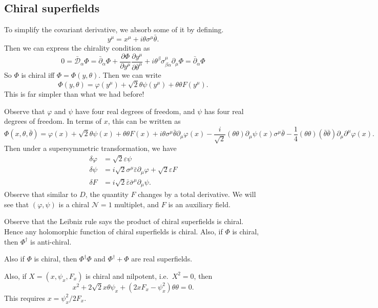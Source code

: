 \documentclass[a4paper]{article}
\begin{document}
\subsection{Chiral superfields}
To simplify the covariant derivative, we absorb some of it by defining.
\[
  y^\mu = x^\mu + i \theta \sigma^\mu \bar{\theta}.
\]
Then we can express the chirality condition as
\[
  0 = \bar{\mathcal{D}}_\alpha \Phi = \bar{\partial}_{\dot{\alpha}} \Phi + \frac{\partial \Phi}{\partial y^\mu} \frac{\partial y^\mu}{\partial \bar{\theta}^\mu} + i \theta^\beta \sigma^\mu_{\beta \dot{\alpha}} \partial_\mu \Phi = \bar{\partial}_{\dot{\alpha}} \Phi
\]
So $\Phi$ is chiral iff $\Phi = \Phi(y, \theta)$. Then we can write
\[
  \Phi(y, \theta) = \varphi(y^\mu) + \sqrt{2} \theta \psi(y^\mu) + \theta \theta F(y^\mu).
\]
This is far simpler than what we had before!

Observe that $\varphi$ and $\psi$ have four real degrees of freedom, and $\psi$ has four real degrees of freedom. In terms of $x$, this can be written as
\[
  \Phi(x, \theta, \bar{\theta}) = \varphi(x) + \sqrt{2} \theta \psi(x) + \theta \theta F(x) + i \theta \sigma^\mu \bar{\theta} \partial_\mu \varphi(x) - \frac{i}{\sqrt{2}} (\theta\theta)\partial_\mu \psi(x) \sigma^\mu \bar{\theta} - \frac{1}{4} (\theta\theta)(\bar{\theta} \bar{\theta}) \partial_\mu \partial^\mu \varphi(x).
\]
Then under a supersymmetric transformation, we have
\begin{align*}
  \delta \varphi &= \sqrt{2} \varepsilon \psi\\
  \delta \psi &= i \sqrt{2} \sigma^\mu \bar{\varepsilon} \partial_\mu \varphi + \sqrt{2} \varepsilon F\\
  \delta F &= i \sqrt{2} \bar{\varepsilon} \bar{\sigma}^\mu \partial_\mu \psi.
\end{align*}
Observe that similar to $D$, the quantity $F$ changes by a total derivative. We will see that $(\varphi, \psi)$ is a chiral $\mathcal{N} = 1$ multiplet, and $F$ is an auxiliary field.

Observe that the Leibniz rule says the product of chiral superfields is chiral. Hence any holomorphic function of chiral superfields is chiral. Also, if $\Phi$ is chiral, then $\Phi^\dagger$ is anti-chiral.

Also if $\Phi$ is chiral, then $\Phi^\dagger \Phi$ and $\Phi^\dagger + \Phi$ are real superfields.

Also, if $X = (x, \psi_x, F_x)$ is chiral and nilpotent, i.e.\ $X^2 = 0$, then
\[
  x^2 + 2 \sqrt{2} x \theta \psi_x + (2x F_x - \psi^2_x)\theta \theta = 0.
\]
This requires $x = \psi_x^2/2F_x$.
\end{document}
